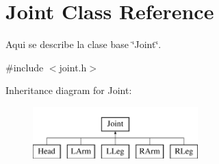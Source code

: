 \hypertarget{class_joint}{\section{Joint Class Reference}
\label{class_joint}
}


Aqui se describe la clase base \char`\"{}\-Joint\char`\"{}.  




{\ttfamily \#include $<$joint.\-h$>$}

Inheritance diagram for Joint\-:\begin{figure}[H]
\begin{center}
\leavevmode
\includegraphics[height=2.000000cm]{class_joint}
\end{center}
\end{figure}
